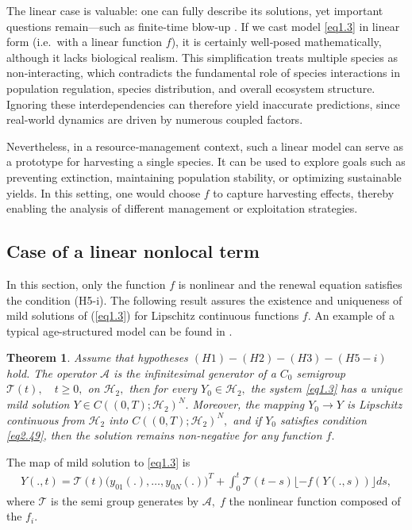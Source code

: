 \documentclass[10pt, a4paper]{amsart}
\newcounter{assu}
\theoremstyle{plain}
\newtheorem{theorem}[lemma]{Theorem}
\theoremstyle{definition}
\theoremstyle{remark}
\numberwithin{equation}{section}
\begin{document}
The linear case is valuable: one can fully describe its solutions, yet important questions remain—such as finite‑time blow‑up \cite{ref22}. If we cast model \eqref{eq1.3} in linear form (i.e.\ with a linear function $f$), it is certainly well‑posed mathematically, although it lacks biological realism. This simplification treats multiple species as non‑interacting, which contradicts the fundamental role of species interactions in population regulation, species distribution, and overall ecosystem structure. Ignoring these interdependencies can therefore yield inaccurate predictions, since real‑world dynamics are driven by numerous coupled factors.

Nevertheless, in a resource‑management context, such a linear model can serve as a prototype for harvesting a single species. It can be used to explore goals such as preventing extinction, maintaining population stability, or optimizing sustainable yields. In this setting, one would choose $f$ to capture harvesting effects, thereby enabling the analysis of different management or exploitation strategies.

\subsection{Case of a linear nonlocal term}%
In this section, only the function $f$ is nonlinear and the renewal equation satisfies the condition (H5-i). The following  result  assures the existence and uniqueness of mild solutions of (\ref{eq1.3}) for Lipschitz continuous functions $f.$ An example of a typical age-structured model can be found in \cite{ref48}.
\begin{theorem}\label{th2.5}
Assume that hypotheses \((H1)-(H2)-(H3)-(H5-i)\) hold. The  operator $\mathcal{A}$  is the infinitesimal generator of a $C_0$ semigroup $\mathcal{T}(t),\quad t\geq 0,$ on $\mathcal{H}_2,$ then for every $Y_0\in \mathcal{H}_2,$ the system \eqref{eq1.3} has a unique mild solution $Y\in C((0,T) ;  \mathcal{H}_2)^N.$
    Moreover, the mapping $Y_0\longrightarrow Y$  is Lipschitz continuous from $ \mathcal{H}_2$ into $C((0,T) ; \mathcal{H}_2)^N,$ and if $Y_0$ satisfies condition \eqref{eq2.49}, then the solution remains non-negative for any  function $f.$
\end{theorem}
The map of mild solution to \eqref{eq1.3} is 
\begin{align}\label{eq2.8}
Y(.,t)=\mathcal{T}(t)\bigl(y_{01}(.),\dots,y_{0N}(.)\bigr)^T+\displaystyle\int_0^t\mathcal{T}(t-s)\lfloor -f(Y(.,s))\rfloor ds,
\end{align}
    where $\mathcal{T}$ is the semi group generates by $\mathcal{A},\; f$  the nonlinear function composed of the $f_i.$
    
\end{document}
